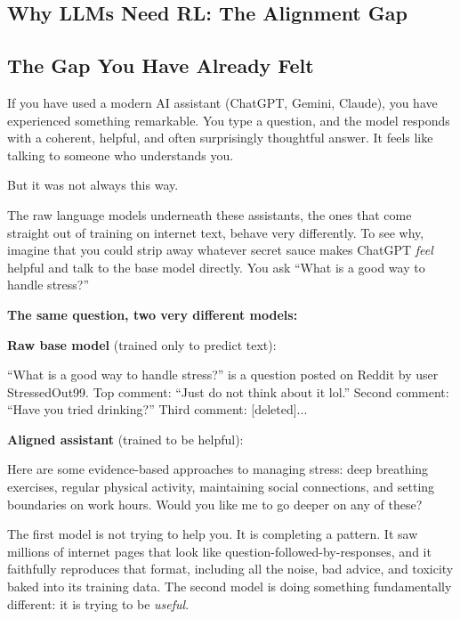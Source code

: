 \begin{chapterenv}

\chapter{Why LLMs Need RL: The Alignment Gap}

\section{The Gap You Have Already Felt}

If you have used a modern AI assistant (ChatGPT, Gemini, Claude), you have experienced something remarkable. You type a question, and the model responds with a coherent, helpful, and often surprisingly thoughtful answer. It feels like talking to someone who understands you.

But it was not always this way.

The raw language models underneath these assistants, the ones that come straight out of training on internet text, behave very differently. To see why, imagine that you could strip away whatever secret sauce makes ChatGPT \textit{feel} helpful and talk to the base model directly. You ask ``What is a good way to handle stress?''

\begin{infobox}
\textbf{The same question, two very different models:}

\textbf{Raw base model} (trained only to predict text):

``What is a good way to handle stress?'' is a question posted on Reddit by user StressedOut99. Top comment: ``Just do not think about it lol.'' Second comment: ``Have you tried drinking?'' Third comment: [deleted]...

\vspace{0.5em}
\textbf{Aligned assistant} (trained to be helpful):

Here are some evidence-based approaches to managing stress: deep breathing exercises, regular physical activity, maintaining social connections, and setting boundaries on work hours. Would you like me to go deeper on any of these?
\end{infobox}

The first model is not trying to help you. It is completing a pattern. It saw millions of internet pages that look like question-followed-by-responses, and it faithfully reproduces that format, including all the noise, bad advice, and toxicity baked into its training data. The second model is doing something fundamentally different: it is trying to be \textit{useful}.


\end{chapterenv}
